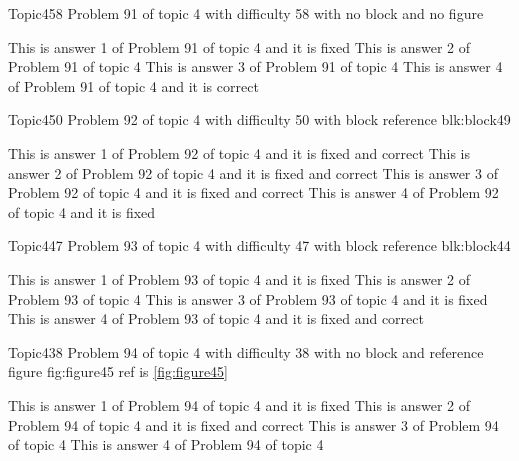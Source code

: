 \documentclass[master]{exam}
\begin{document}
\begin{problem}{Topic4}{58}
	Problem 91 of topic 4 with difficulty 58 with no block and no figure
	\begin{answers}
		\answer[fixed] This is answer 1 of Problem 91 of topic 4 and it is fixed
		\answer This is answer 2 of Problem 91 of topic 4 
		\answer This is answer 3 of Problem 91 of topic 4 
		\answer[correct] This is answer 4 of Problem 91 of topic 4 and it is correct
	\end{answers}
\end{problem}

\begin{problem}[requires=blk:block49]{Topic4}{50}
	Problem 92 of topic 4 with difficulty 50 with block reference blk:block49
	\begin{answers}
		 This is answer 1 of Problem 92 of topic 4 and it is fixed and correct
		 This is answer 2 of Problem 92 of topic 4 and it is fixed and correct
		 This is answer 3 of Problem 92 of topic 4 and it is fixed and correct
		\answer[fixed] This is answer 4 of Problem 92 of topic 4 and it is fixed
	\end{answers}
\end{problem}

\begin{problem}[requires=blk:block44]{Topic4}{47}
	Problem 93 of topic 4 with difficulty 47 with block reference blk:block44
	\begin{answers}
		\answer[fixed] This is answer 1 of Problem 93 of topic 4 and it is fixed
		\answer This is answer 2 of Problem 93 of topic 4 
		\answer[fixed] This is answer 3 of Problem 93 of topic 4 and it is fixed
		 This is answer 4 of Problem 93 of topic 4 and it is fixed and correct
	\end{answers}
\end{problem}

\begin{problem}{Topic4}{38}
	Problem 94 of topic 4 with difficulty 38 with no block and reference figure fig:figure45 ref is \ref{fig:figure45}
	\begin{answers}
		\answer[fixed] This is answer 1 of Problem 94 of topic 4 and it is fixed
		 This is answer 2 of Problem 94 of topic 4 and it is fixed and correct
		\answer This is answer 3 of Problem 94 of topic 4 
		\answer This is answer 4 of Problem 94 of topic 4 
	\end{answers}
\end{problem}
\end{document}
